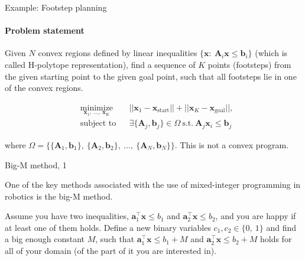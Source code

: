 \documentclass{beamer}
\begin{document}
\begin{frame}{Example: Footstep planning}
\framesubtitle{Problem statement}
\begin{flushleft}

Given $N$ convex regions defined by linear inequalities $\{ \mathbf{x}: \  \mathbf{A}_i \mathbf{x} \leq \mathbf{b}_i \}$ (which is called H-polytope representation), find a sequence of $K$ points (footsteps) from the given starting point to the given goal point, such that all footsteps lie in one of the convex regions.

\begin{equation}
\begin{aligned}
& \underset{\mathbf{x}_1, \ ..., \ \mathbf{x}_K}{\text{minimize}}
& & ||\mathbf{x}_1 - \mathbf{x}_{\text{start}}|| + ||\mathbf{x}_K - \mathbf{x}_{\text{goal}}||, \\
& \text{subject to}
& & \exists \{ \mathbf{A}_j, \mathbf{b}_j\} \in \Omega \ \text{s.t.} \ \mathbf{A}_j\mathbf{x}_i \leq \mathbf{b}_j
\end{aligned}
\end{equation}

\bigskip

where $\Omega = \{ \{ \mathbf{A}_1, \mathbf{b}_1\}, \ \{ \mathbf{A}_2, \mathbf{b}_2\}, \ ..., \ \{ \mathbf{A}_N, \mathbf{b}_N\} \}$. This is not a convex program.
 
\end{flushleft}
\end{frame}




\begin{frame}{Big-M method, 1}
\begin{flushleft}


One of the key methods associated with the use of mixed-integer programming in robotics is the big-M method. 

\bigskip

Assume you have two inequalities, $\mathbf{a}_1^\top \mathbf{x} \leq b_1$ and $\mathbf{a}_2^\top \mathbf{x} \leq b_2$, and you are happy if at least one of them holds. Define a new binary variables $c_1, c_2 \in \{0, \ 1 \}$ and find a big enough constant $M$, such that $\mathbf{a}_1^\top \mathbf{x} \leq b_1 + M$ and $\mathbf{a}_2^\top \mathbf{x} \leq b_2 + M$ holds for all of your domain (of the part of it you are interested in).



\begin{figure} [h!]
	\begin{center}
		
	\end{center} 
\end{figure}

\end{flushleft}
\end{frame}
\end{document}

